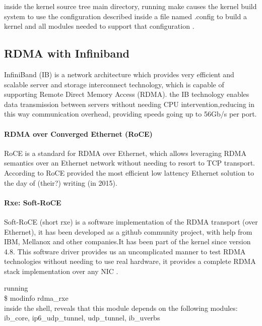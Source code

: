 inside the kernel source tree main directory, running make causes the kernel build system to use the configuration 
described inside a file named .config to build a kernel and all modules needed to support that configuration 
\cite{kroah-hartman06}.

\subsection{RDMA with Infiniband}


InfiniBand (IB) is a network architecture which provides very efficient and scalable server and storage interconnect
technology, which is capable of supporting Remote Direct Memory Access (RDMA). the IB technology enables data 
transmission between servers without needing CPU intervention,reducing in this way communication overhead, providing 
speeds going up to 56Gb/s per port\cite{rdmamanual}.


\paragraph{RDMA over Converged Ethernet (RoCE)}

RoCE is a standard for RDMA over Ethernet, which allows leveraging RDMA semantics over an Ethernet network without needing
to resort to TCP transport. According to \cite{rdmamanual} RoCE provided the most efficient low lattency Ethernet
solution to the day of (their?) writing (in 2015).

\paragraph{Rxe: Soft-RoCE}

Soft-RoCE (short rxe) is a software implementation of the RDMA transport (over Ethernet), it has been developed as a github 
community project, with help from IBM, Mellanox and other companies.It has been part of the kernel since version 4.8.
This software driver provides us an uncomplicated manner to test RDMA technologies without needing to use real hardware, it provides a complete 
RDMA stack implementation over any NIC \cite{mellanox-community}.

running \\ \$ modinfo rdma\_rxe \\ inside the shell, reveals that this module depends on the following modules: ib\_core, ip6\_udp\_tunnel, udp\_tunnel, ib\_uverbs 

